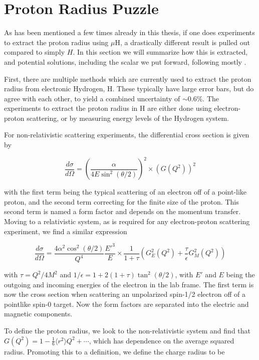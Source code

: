 \section{Proton Radius Puzzle}
As has been mentioned a few times already in this thesis, if one does experiments to extract the proton radius using $\mu\textrm{H}$, a drastically different result is pulled out compared to simply $H$.
In this section we will summarize how this is extracted, and potential solutions, including the scalar we put forward, following mostly \cite{Carlson:2015jba}.

First, there are multiple methods which are currently used to extract the proton radius from electronic Hydrogen, H.
These typically have large error bars, but do agree with each other, to yield a combined uncertainty of $\sim 0.6\%$.
The experiments to extract the proton radius in H are either done using electron-proton scattering, or by measuring energy levels of the Hydrogen system.

For non-relativistic scattering experiments, the differential cross section is given by

\begin{equation}
    \frac{d\sigma}{d\Omega} = \left(\frac{\alpha}{4E\sin^2(\theta/2)}\right)^2 \times \left(G(Q^2)\right)^2
\end{equation}

\noindent with the first term being the typical scattering of an electron off of a point-like proton, and the second term correcting for the finite size of the proton.
This second term is named a form factor and depends on the momentum transfer.
Moving to a relativistic system, as is required for any electron-proton scattering experiment, we find a similar expression

\begin{equation}
    \frac{d\sigma}{d\Omega} = \frac{4 \alpha^2 \cos^2(\theta/2)}{Q^4} \frac{E'^3}{E} \times \frac{1}{1+\tau}\left(G_E^2(Q^2) + \frac{\tau}{\epsilon}G_M^2(Q^2)\right)
\end{equation}

\noindent with $\tau = Q^2/4M^2$ and $1/\epsilon = 1 + 2(1+\tau)\tan^2(\theta/2)$, with $E'$ and $E$ being the outgoing and incoming energies of the electron in the lab frame.
The first term is now the cross section when scattering an unpolarized spin-1/2 electron off of a pointlike spin-0 target.
Now the form factors are separated into the electric and magnetic components.

To define the proton radius, we look to the non-relativistic system and find that $G(Q^2) = 1 - \frac{1}{6}\langle r^2 \rangle Q^2 + \cdots$, which has dependence on the average squared radius.
Promoting this to a definition, we define the charge radius to be

